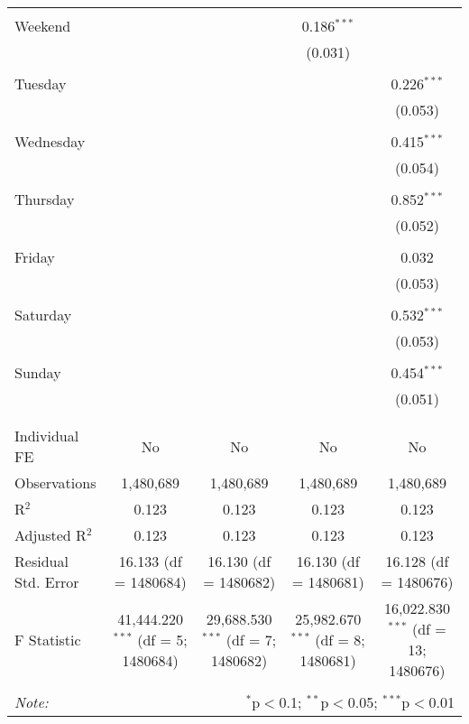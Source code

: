 \documentclass[
]{article}
\begin{document}
\begin{table}[!htbp]
{\begin{tabular}{@{\extracolsep{5pt}}lcccc}
  & & & & \\ 
 Weekend &  &  & 0.186$^{***}$ &  \\ 
  &  &  & (0.031) &  \\ 
  & & & & \\ 
 Tuesday &  &  &  & 0.226$^{***}$ \\ 
  &  &  &  & (0.053) \\ 
  & & & & \\ 
 Wednesday &  &  &  & 0.415$^{***}$ \\ 
  &  &  &  & (0.054) \\ 
  & & & & \\ 
 Thursday &  &  &  & 0.852$^{***}$ \\ 
  &  &  &  & (0.052) \\ 
  & & & & \\ 
 Friday &  &  &  & 0.032 \\ 
  &  &  &  & (0.053) \\ 
  & & & & \\ 
 Saturday &  &  &  & 0.532$^{***}$ \\ 
  &  &  &  & (0.053) \\ 
  & & & & \\ 
 Sunday &  &  &  & 0.454$^{***}$ \\ 
  &  &  &  & (0.051) \\ 
  & & & & \\ 
\hline \\[-1.8ex] 
Individual FE & No & No & No & No \\ 
Observations & 1,480,689 & 1,480,689 & 1,480,689 & 1,480,689 \\ 
R$^{2}$ & 0.123 & 0.123 & 0.123 & 0.123 \\ 
Adjusted R$^{2}$ & 0.123 & 0.123 & 0.123 & 0.123 \\ 
Residual Std. Error & 16.133 (df = 1480684) & 16.130 (df = 1480682) & 16.130 (df = 1480681) & 16.128 (df = 1480676) \\ 
F Statistic & 41,444.220$^{***}$ (df = 5; 1480684) & 29,688.530$^{***}$ (df = 7; 1480682) & 25,982.670$^{***}$ (df = 8; 1480681) & 16,022.830$^{***}$ (df = 13; 1480676) \\ 
\hline 
\hline \\[-1.8ex] 
\textit{Note:}  & \multicolumn{4}{r}{$^{*}$p$<$0.1; $^{**}$p$<$0.05; $^{***}$p$<$0.01} \\ 
\end{tabular}
} 
\end{table} 
\newpage
\end{document}
